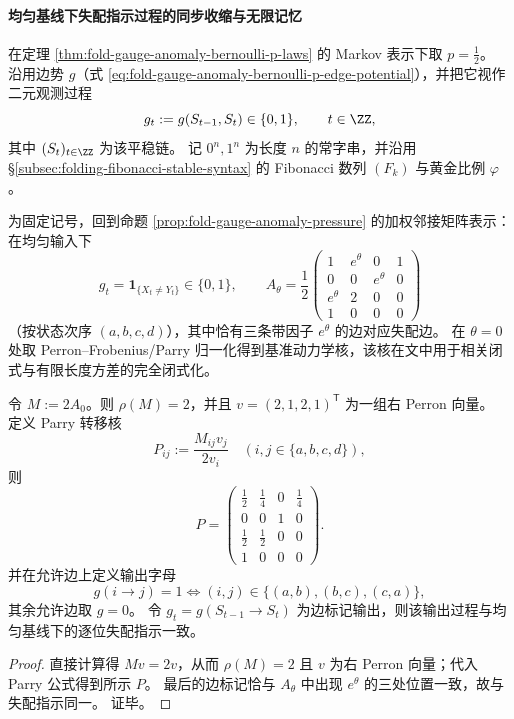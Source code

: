 
\paragraph{均匀基线下失配指示过程的同步收缩与无限记忆}\label{par:fold-gauge-anomaly-sofic-memory}
在定理 \ref{thm:fold-gauge-anomaly-bernoulli-p-laws} 的 Markov 表示下取 \(p=\tfrac12\)。
沿用边势 \(g\)（式 \eqref{eq:fold-gauge-anomaly-bernoulli-p-edge-potential}），并把它视作二元观测过程
\[
g_t:=g(S_{t-1},S_t)\in\{0,1\},\qquad t\in\ZZ,
\]
其中 \((S_t)_{t\in\ZZ}\) 为该平稳链。
记 \(0^n,1^n\) 为长度 \(n\) 的常字串，并沿用 \S\ref{subsec:folding-fibonacci-stable-syntax} 的 Fibonacci 数列 \((F_k)\) 与黄金比例 \(\varphi\)。

\par
为固定记号，回到命题 \ref{prop:fold-gauge-anomaly-pressure} 的加权邻接矩阵表示：在均匀输入下
\[
g_t=\mathbf 1_{\{X_t\neq Y_t\}}\in\{0,1\},
\qquad
A_\theta=\frac12\begin{pmatrix}
1 & e^\theta & 0 & 1\\
0 & 0 & e^\theta & 0\\
e^\theta & 2 & 0 & 0\\
1 & 0 & 0 & 0
\end{pmatrix}
\]
（按状态次序 \((a,b,c,d)\)），其中恰有三条带因子 \(e^\theta\) 的边对应失配边。
在 \(\theta=0\) 处取 Perron--Frobenius/Parry 归一化得到基准动力学核，该核在文中用于相关闭式与有限长度方差的完全闭式化。

\begin{proposition}\label{prop:fold-gauge-anomaly-parry-kernel-mismatch-label}
令 \(M:=2A_0\)。则 \(\rho(M)=2\)，并且 \(v=(2,1,2,1)^{\mathsf T}\) 为一组右 Perron 向量。
定义 Parry 转移核
\[
P_{ij}:=\frac{M_{ij}v_j}{2v_i}\quad (i,j\in\{a,b,c,d\}),
\]
则
\[
P=
\begin{pmatrix}
\frac12&\frac14&0&\frac14\\[2pt]
0&0&1&0\\[2pt]
\frac12&\frac12&0&0\\[2pt]
1&0&0&0
\end{pmatrix}.
\]
并在允许边上定义输出字母
\[
g(i\to j)=1\iff (i,j)\in\{(a,b),(b,c),(c,a)\},
\]
其余允许边取 \(g=0\)。
令 \(g_t=g(S_{t-1}\to S_t)\) 为边标记输出，则该输出过程与均匀基线下的逐位失配指示一致。
\end{proposition}
\begin{proof}
直接计算得 \(Mv=2v\)，从而 \(\rho(M)=2\) 且 \(v\) 为右 Perron 向量；代入 Parry 公式得到所示 \(P\)。
最后的边标记恰与 \(A_\theta\) 中出现 \(e^\theta\) 的三处位置一致，故与失配指示同一。
证毕。
\end{proof}

